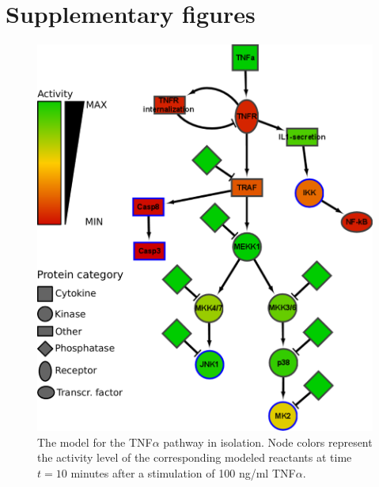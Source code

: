 \documentclass{bmcart}
\begin{document}
%
%
%
%





\clearpage

\section{Supplementary figures}\label{sec:supplementary-figures}


\begin{figure}[htpb]
\begin{minipage}{\textwidth}
\centering
  \includegraphics[width=.7\textwidth]{images/large_network_tnfa2}
\caption{The model for the TNF$\alpha$ pathway in isolation. Node colors represent the activity level of the
corresponding modeled reactants at time $t = 10$ minutes after a stimulation of 100 ng/ml TNF$\alpha$.}\label{fig:large-model-tnf}
\end{minipage}
\end{figure}
\end{document}

